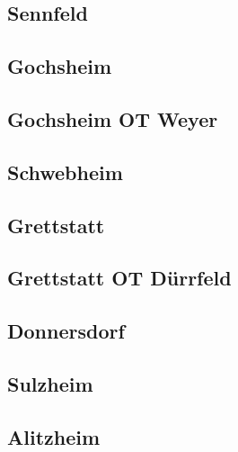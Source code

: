\documentclass[fontsize=12pt,a4paper]{scrreprt}
\begin{document}
                \subsection{Sennfeld}
                
                
                \subsection{Gochsheim}
                
                
                \subsection{Gochsheim OT Weyer}
                
                
                \subsection{Schwebheim}
                
                
                \subsection{Grettstatt}
                
                
                \subsection{Grettstatt OT Dürrfeld}
                
                
                \subsection{Donnersdorf}
                
                
                \subsection{Sulzheim}
                
                
                \subsection{Alitzheim}
                
                
\end{document}
